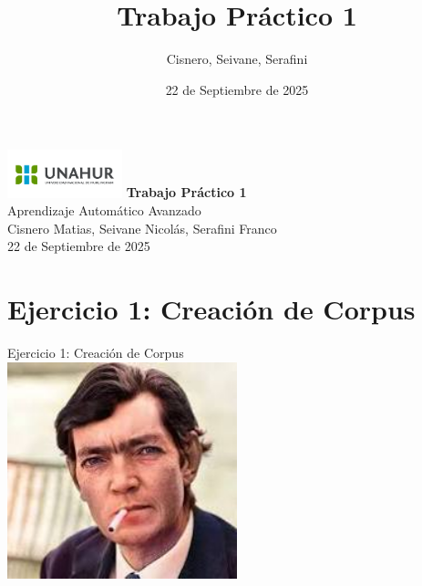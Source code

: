 \documentclass{beamer}
\title{Trabajo Práctico 1}
\author{Cisnero, Seivane, Serafini}
\date{22 de Septiembre de 2025}
\begin{document}
\begin{frame}
	\centering
	\includegraphics[width=0.25\textwidth]{UNAHUR (2)}
	\vfill
	{\huge \textbf{Trabajo Práctico 1}}\\[0.2cm]
	{\Large Aprendizaje Automático Avanzado}\\
	\vfill
	{\large Cisnero Matias, Seivane Nicolás, Serafini Franco}\\
	{\small 22 de Septiembre de 2025}
\end{frame}


\section{Ejercicio 1: Creación de Corpus}

\begin{frame}{}
	\centering
	\Large Ejercicio 1: Creación de Corpus\\
	\vspace{0.8cm}
	\includegraphics[width=0.5\textwidth]{imagen_cortazar}
\end{frame}
	
\end{document}
